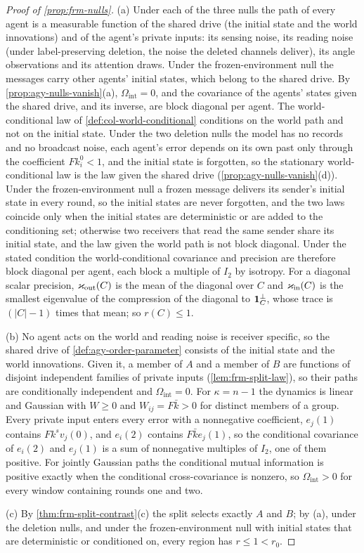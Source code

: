 \begin{proof}[Proof of \cref{prop:frm-nulls}]
(a) Under each of the three nulls the path of every agent is a measurable function of the shared drive (the initial state and the world innovations) and of the agent's private inputs: its sensing noise, its reading noise (under label-preserving deletion, the noise the deleted channels deliver), its angle observations and its attention draws. Under the frozen-environment null the messages carry other agents' initial states, which belong to the shared drive. By \cref{prop:agy-nulls-vanish}(a), $\Omega_{\mathrm{int}}=0$, and the covariance of the agents' states given the shared drive, and its inverse, are block diagonal per agent. The world-conditional law of \cref{def:col-world-conditional} conditions on the world path and not on the initial state. Under the two deletion nulls the model has no records and no broadcast noise, each agent's error depends on its own past only through the coefficient $Fk^0_i<1$, and the initial state is forgotten, so the stationary world-conditional law is the law given the shared drive (\cref{prop:agy-nulls-vanish}(d)). Under the frozen-environment null a frozen message delivers its sender's initial state in every round, so the initial states are never forgotten, and the two laws coincide only when the initial states are deterministic or are added to the conditioning set; otherwise two receivers that read the same sender share its initial state, and the law given the world path is not block diagonal. Under the stated condition the world-conditional covariance and precision are therefore block diagonal per agent, each block a multiple of $I_2$ by isotropy. For a diagonal scalar precision, $\varkappa_{\mathrm{out}}(C)$ is the mean of the diagonal over $C$ and $\varkappa_{\mathrm{in}}(C)$ is the smallest eigenvalue of the compression of the diagonal to $\mathbf{1}_C^\perp$, whose trace is $(\vert C\vert-1)$ times that mean; so $r(C)\le1$.

(b) No agent acts on the world and reading noise is receiver specific, so the shared drive of \cref{def:agy-order-parameter} consists of the initial state and the world innovations. Given it, a member of $A$ and a member of $B$ are functions of disjoint independent families of private inputs (\cref{lem:frm-split-law}), so their paths are conditionally independent and $\Omega_{\mathrm{int}}=0$. For $\kappa=n-1$ the dynamics is linear and Gaussian with $W\ge0$ and $W_{ij}=F\bar k>0$ for distinct members of a group. Every private input enters every error with a nonnegative coefficient, $e_j(1)$ contains $Fk^sv_j(0)$, and $e_i(2)$ contains $F\bar ke_j(1)$, so the conditional covariance of $e_i(2)$ and $e_j(1)$ is a sum of nonnegative multiples of $I_2$, one of them positive. For jointly Gaussian paths the conditional mutual information is positive exactly when the conditional cross-covariance is nonzero, so $\Omega_{\mathrm{int}}>0$ for every window containing rounds one and two.

(c) By \cref{thm:frm-split-contrast}(c) the split selects exactly $A$ and $B$; by (a), under the deletion nulls, and under the frozen-environment null with initial states that are deterministic or conditioned on, every region has $r\le1<r_0$.
\end{proof}

